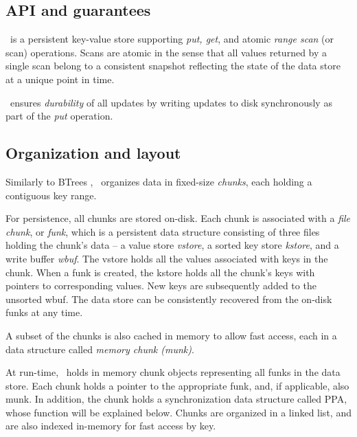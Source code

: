 

\subsection{API and guarantees}

\sys\ is a persistent key-value store supporting \emph{put, get}, and atomic \emph{range scan} (or scan) operations. 
Scans are atomic in the sense that all values returned by a single scan belong to a consistent snapshot reflecting
the state of the data store at a unique point in time.


\sys\ ensures \emph{durability} of all updates by writing updates to disk synchronously as part of the \emph{put} operation.

\subsection{Organization and layout}

Similarly to BTrees , 
\sys\ organizes data in fixed-size \emph{chunks}, each holding a contiguous key range.

For persistence, all chunks are stored on-disk. Each chunk is associated with a \emph{file chunk}, or \emph{funk},
which is a persistent data structure consisting of three files holding the chunk's data -- a value store \emph{vstore}, 
a sorted key store \emph{kstore}, and a write buffer \emph{wbuf}. The vstore holds all the values associated with keys
in the chunk. When a funk is created, the kstore holds all the chunk's keys with pointers to corresponding values.
New keys are subsequently added to the unsorted wbuf.
The data store can be consistently recovered from the on-disk funks at any time. 

A subset of the chunks is also cached in memory to allow fast access, each in a data structure called \emph{memory chunk (munk)}. 

At run-time, \sys\ holds in memory chunk objects representing all funks in the data store. Each chunk holds 
a pointer to the appropriate funk, and, if applicable, also munk. In addition, the chunk holds a  synchronization data
structure called PPA, whose function will be explained below. 
Chunks are organized in a linked list, and are also indexed in-memory for fast access by key.





  




